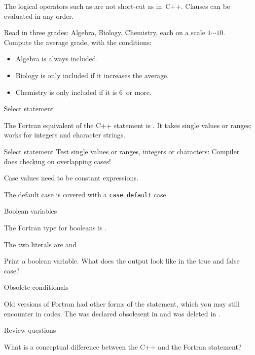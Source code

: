 The logical operators such as  are not short-cut as
in~C++. Clauses can be evaluated in any order.

\begin{exercise}
  \label{ex:fgrades}
  Read in three grades: Algebra, Biology, Chemistry, each on a scale
  $1\cdots 10$. Compute the average grade, with the conditions:
  \begin{itemize}
  \item Algebra is always included.
  \item Biology is only included if it increases the average.
  \item Chemistry is only included if it is 6~or more.
  \end{itemize}
\end{exercise}

 {Select statement}

The Fortran equivalent of the C++  statement is . It takes
single values or ranges; works for integers and character strings.

\begin{block}{Select statement}
  \label{sl:fswitch}
  Test single values or ranges, integers or characters:
  Compiler does checking on overlapping cases!

  Case values need to be constant expressions.
\end{block}

The default case is covered with a \lstinline{case default} case.

 {Boolean variables}

The Fortran type for booleans is .

The two literals are  and 

\begin{exercise}
  \label{ex:fprintbool}
  Print a boolean variable. What does the output look like in the true
  and false case?
\end{exercise}

 {Obsolete conditionals}

Old versions of Fortran had other forms of the  statement,
which you may still encounter in codes.
The  was declared obsolesent
in  and was deleted in .

 {Review questions}

\begin{exercise}
  \label{ex:select-vs-switch}
  What is a conceptual difference between the C++  and the
  Fortran  statement?
\end{exercise}
